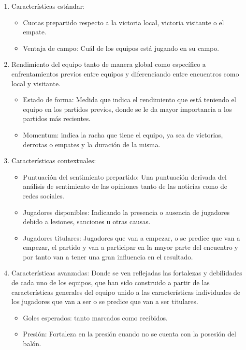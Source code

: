 \begin{enumerate}
    \item Características estándar:
        \begin{itemize}
            \item Cuotas prepartido respecto a la victoria local, victoria visitante o el empate.
            \item Ventaja de campo: Cuál de los equipos está jugando en su campo.
        \end{itemize}
    \item Rendimiento del equipo tanto de manera global como específico a enfrentamientos previos entre equipos y diferenciando entre encuentros como local y visitante.
    \begin{itemize}
        \item Estado de forma: Medida que indica el rendimiento que está teniendo el equipo en los partidos previos, donde se le da mayor importancia a los partidos más recientes.
        \item Momentum: indica la racha que tiene el equipo, ya sea de victorias, derrotas o empates y la duración de la misma.
    \end{itemize}
    \item Características contextuales:
    \begin{itemize}
        \item Puntuación del sentimiento prepartido: Una puntuación derivada del análisis de sentimiento de las opiniones tanto de las noticias como de redes sociales.
        \item Jugadores disponibles: Indicando la presencia o ausencia de jugadores debido a lesiones, sanciones u otras causas.
        \item Jugadores titulares: Jugadores que van a empezar, o se predice que van a empezar, el partido y van a participar en la mayor parte del encuentro y por tanto van a tener una gran influencia en el resultado.
    \end{itemize}
    \item Características avanzadas: Donde se ven reflejadas las fortalezas y debilidades de cada uno de los equipos, que han sido construido a partir de las características generales del equipo unido a las características individuales de los jugadores que van a ser o se predice que van a ser titulares.
    \begin{itemize}
        \item Goles esperados: tanto marcados como recibidos.
        \item Presión: Fortaleza en la presión cuando no se cuenta con la posesión del balón.

\end{itemize}
\end{enumerate}
